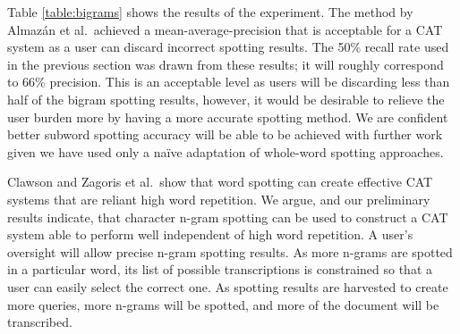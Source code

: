 \documentclass[conference]{IEEEtran}
\begin{document}



Table \ref{table:bigrams} shows the results of the experiment. The method by Almaz\'{a}n et al.~achieved a mean-average-precision that is acceptable for a CAT system as a user can discard incorrect spotting results.
The 50\% recall rate used in the previous section was drawn from these results; it will roughly correspond to 66\% precision. This is an acceptable level as users will be discarding less than half of the bigram spotting results, however, it would be desirable to relieve the user burden more by having a more accurate spotting method.
We are confident better subword spotting accuracy will be able to be achieved with further work given we have used only a na\"{i}ve adaptation of whole-word spotting approaches.

Clawson and Zagoris et al.~show that word spotting can create effective CAT systems that are reliant high word repetition. We argue, and our preliminary results indicate, that character n-gram spotting can be used to construct a CAT system able to perform well independent of high word repetition. A user's oversight will allow precise n-gram spotting results. As more n-grams are spotted in a particular word, its list of possible transcriptions is constrained so that a user can easily select the correct one. As spotting results are harvested to create more queries, more n-grams will be spotted, and more of the document will be transcribed.
\end{document}
